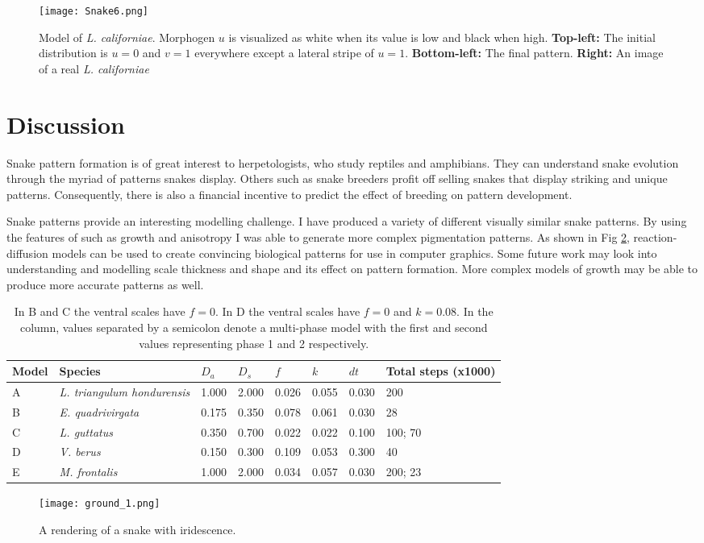 \begin{figure}[h]
	\centering
	\texttt{[image: Snake6.png]}
	\caption{Model of \textit{L. californiae}. Morphogen $u$ is visualized as white when its value is low and black when high. \textbf{Top-left:} The initial distribution is $u=0$ and $v=1$ everywhere except a lateral stripe  of $u=1$. \textbf{Bottom-left:} The final pattern. \textbf{Right:} An image of a real \textit{L. californiae}}
	\label{fig:Snake6}
\end{figure}

\newpage

\section{Discussion}
Snake pattern formation is of great interest to herpetologists, who study reptiles and amphibians. They can understand snake evolution through the myriad of patterns snakes display. Others such as snake breeders profit off selling snakes that display striking and unique patterns. Consequently, there is also a financial incentive to predict the effect of breeding on pattern development. 

Snake patterns provide an interesting modelling challenge. I have produced a variety of different visually similar snake patterns. By using the features of \ProgramName{} such as growth and anisotropy I was able to generate more complex pigmentation patterns. As shown in Fig \ref{fig:SnakeRendering}, reaction-diffusion models can be used to create convincing biological patterns for use in computer graphics. Some future work may look into understanding and modelling scale thickness and shape and its effect on pattern formation. More complex models of growth may be able to produce more accurate patterns as well.

\begin{table}[h]
	\centering
	\begin{tabular}{|l|l|l|l|l|l|l|l|}
	\hline
	Model & Species                      &$D_a$ &$D_s$ &$f$    &$k$   &$dt$ &Total steps (x1000)\\ \hline 
	A     &\textit{L. triangulum hondurensis} &1.000 &2.000 &0.026 &0.055 &0.030 &200                \\ \hline
	B     &\textit{E. quadrivirgata}     &0.175 &0.350 &0.078 &0.061 &0.030 &28                 \\ \hline
	C     &\textit{L. guttatus}          &0.350 &0.700 &0.022 &0.022 &0.100 &100; 70            \\ \hline
	D     &\textit{V. berus}             &0.150 &0.300 &0.109 &0.053 &0.300 &40                 \\ \hline
	E     &\textit{M. frontalis}         &1.000 &2.000 &0.034 &0.057 &0.030 &200; 23            \\ \hline
	\end{tabular}
	\caption {In B and C the ventral scales have $f=0$. In D the ventral scales have $f=0$ and $k=0.08$. In the  column, values separated by a semicolon denote a multi-phase model with the first and second values representing phase 1 and 2 respectively.}
	\label{tab:snakeParameters}
\end{table}

\begin{figure}[p]
	\centering
	\texttt{[image: ground\_1.png]}
	\caption{A rendering of a snake with iridescence.}
	\label{fig:SnakeRendering}
\end{figure}